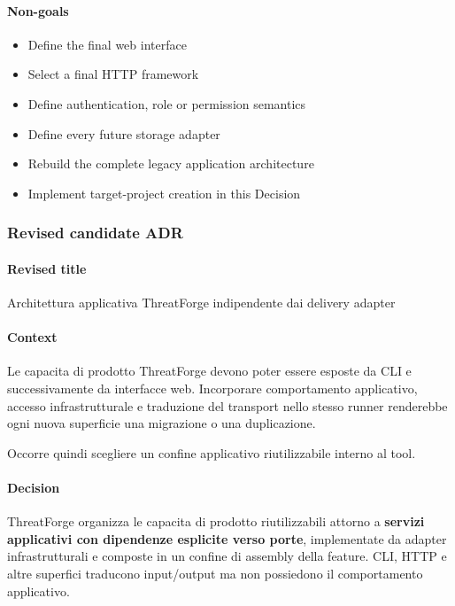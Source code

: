 \documentclass[
  10pt,
]{article}
\providecommand{\tightlist}{%
  \setlength{\itemsep}{0pt}\setlength{\parskip}{0pt}}
\begin{document}
\paragraph{Non-goals}\label{non-goals-10}

\begin{itemize}
\tightlist
\item
  Define the final web interface
\item
  Select a final HTTP framework
\item
  Define authentication, role or permission semantics
\item
  Define every future storage adapter
\item
  Rebuild the complete legacy application architecture
\item
  Implement target-project creation in this Decision
\end{itemize}

\subsubsection{Revised candidate ADR}\label{revised-candidate-adr-15}

\paragraph{Revised title}\label{revised-title-15}

Architettura applicativa ThreatForge indipendente dai delivery adapter

\paragraph{Context}\label{context-31}

Le capacita di prodotto ThreatForge devono poter essere esposte da CLI e
successivamente da interfacce web. Incorporare comportamento
applicativo, accesso infrastrutturale e traduzione del transport nello
stesso runner renderebbe ogni nuova superficie una migrazione o una
duplicazione.

Occorre quindi scegliere un confine applicativo riutilizzabile interno
al tool.

\paragraph{Decision}\label{decision-31}

ThreatForge organizza le capacita di prodotto riutilizzabili attorno a
\textbf{servizi applicativi con dipendenze esplicite verso porte},
implementate da adapter infrastrutturali e composte in un confine di
assembly della feature. CLI, HTTP e altre superfici traducono
input/output ma non possiedono il comportamento applicativo.
\end{document}
